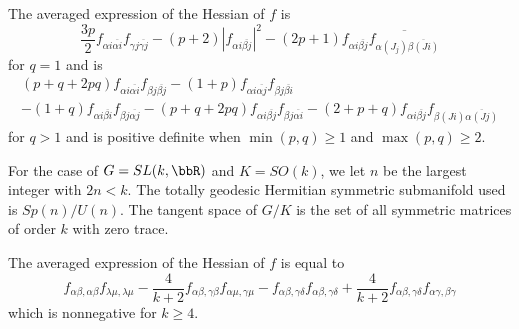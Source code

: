 The averaged expression of the Hessian of $f$ is
$$
\dfrac{3p}{2}f_{\alpha i \overline{\alpha i}}f_{\gamma j \overline{\gamma j}}-(p +2)|f_{\alpha i \overline{\beta j}}|^{2}-(2p +1)f_{\alpha i \overline{\beta j}}\overline{f_{\alpha(J_{j})\overline{\beta(Ji)}}}
$$
for $q=1$ and is
\begin{gather*}
(p + q + 2pq)f_{\alpha i \overline{\alpha i}}f_{\beta j \overline{\beta j}}-(1 + p)f_{\alpha i \overline{\alpha j}}f_{\beta j \overline{\beta i}}\\
-(1 +q)f_{\alpha i \overline{\beta i}}f_{\beta j \overline{\alpha  j}}-(p + q + 2pq)f_{\alpha i \overline{\beta j}}f_{\beta j \overline{\alpha i}}-(2 + p + q)f_{\alpha i \overline{\beta j}}f_{\beta (Ji)\overline{\alpha(J j)}}  
\end{gather*}
for $q > 1$ and is positive definite when $\min(p,q)\geq 1$ and $\max(p,q)\geq 2$.

For the case of $G=SL(k, \bbR)$ and $K=SO(k)$, we let $n$ be the largest integer with $2n < k$. The totally geodesic Hermitian symmetric submanifold used is $Sp(n)/U(n)$. The tangent space of $G/K$ is the set of all symmetric matrices of order $k$ with zero trace.

The averaged expression of the Hessian of $f$ is equal to
$$
f_{\alpha \beta, \alpha\beta}f_{\lambda \mu, \lambda \mu} - \dfrac{4}{k + 2}f_{\alpha \beta, \gamma \beta}f_{\alpha \mu, \gamma \mu}- f_{\alpha \beta, \gamma \delta}f_{\alpha \beta, \gamma \delta} + \dfrac{4}{k+2}f_{\alpha \beta, \gamma \delta}f_{\alpha \gamma , \beta \gamma}
$$
which is nonnegative for $k \geq 4$.

